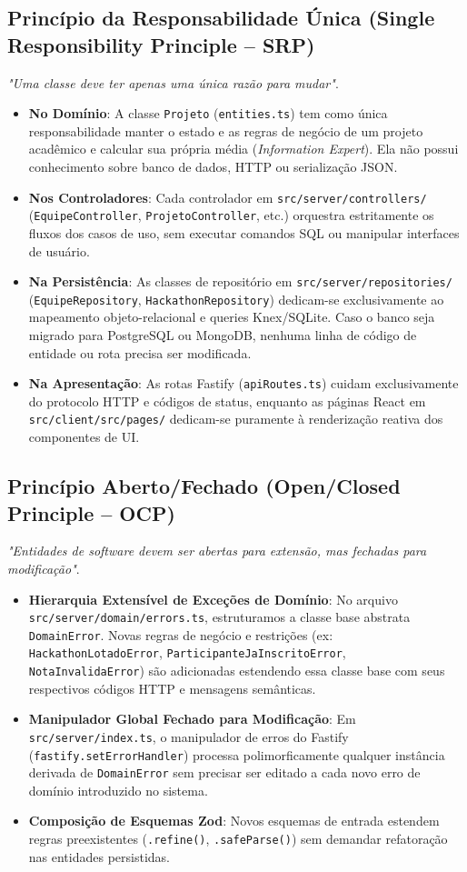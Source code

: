 \documentclass[12pt]{article}
\begin{document}
\subsection{Princípio da Responsabilidade Única (Single Responsibility Principle -- SRP)}
\textit{"Uma classe deve ter apenas uma única razão para mudar"}.
\begin{itemize}
    \item \textbf{No Domínio}: A classe \texttt{Projeto} (\texttt{entities.ts}) tem como única responsabilidade manter o estado e as regras de negócio de um projeto acadêmico e calcular sua própria média (\textit{Information Expert}). Ela não possui conhecimento sobre banco de dados, HTTP ou serialização JSON.
    \item \textbf{Nos Controladores}: Cada controlador em \texttt{src/server/controllers/} (\texttt{EquipeController}, \texttt{ProjetoController}, etc.) orquestra estritamente os fluxos dos casos de uso, sem executar comandos SQL ou manipular interfaces de usuário.
    \item \textbf{Na Persistência}: As classes de repositório em \texttt{src/server/repositories/} (\texttt{EquipeRepository}, \texttt{HackathonRepository}) dedicam-se exclusivamente ao mapeamento objeto-relacional e queries Knex/SQLite. Caso o banco seja migrado para PostgreSQL ou MongoDB, nenhuma linha de código de entidade ou rota precisa ser modificada.
    \item \textbf{Na Apresentação}: As rotas Fastify (\texttt{apiRoutes.ts}) cuidam exclusivamente do protocolo HTTP e códigos de status, enquanto as páginas React em \texttt{src/client/src/pages/} dedicam-se puramente à renderização reativa dos componentes de UI.
\end{itemize}

\subsection{Princípio Aberto/Fechado (Open/Closed Principle -- OCP)}
\textit{"Entidades de software devem ser abertas para extensão, mas fechadas para modificação"}.
\begin{itemize}
    \item \textbf{Hierarquia Extensível de Exceções de Domínio}: No arquivo \texttt{src/server/domain/errors.ts}, estruturamos a classe base abstrata \texttt{DomainError}. Novas regras de negócio e restrições (ex: \texttt{HackathonLotadoError}, \texttt{ParticipanteJaInscritoError}, \texttt{NotaInvalidaError}) são adicionadas estendendo essa classe base com seus respectivos códigos HTTP e mensagens semânticas.
    \item \textbf{Manipulador Global Fechado para Modificação}: Em \texttt{src/server/index.ts}, o manipulador de erros do Fastify (\texttt{fastify.setErrorHandler}) processa polimorficamente qualquer instância derivada de \texttt{DomainError} sem precisar ser editado a cada novo erro de domínio introduzido no sistema.
    \item \textbf{Composição de Esquemas Zod}: Novos esquemas de entrada estendem regras preexistentes (\texttt{.refine()}, \texttt{.safeParse()}) sem demandar refatoração nas entidades persistidas.
\end{itemize}
\end{document}
